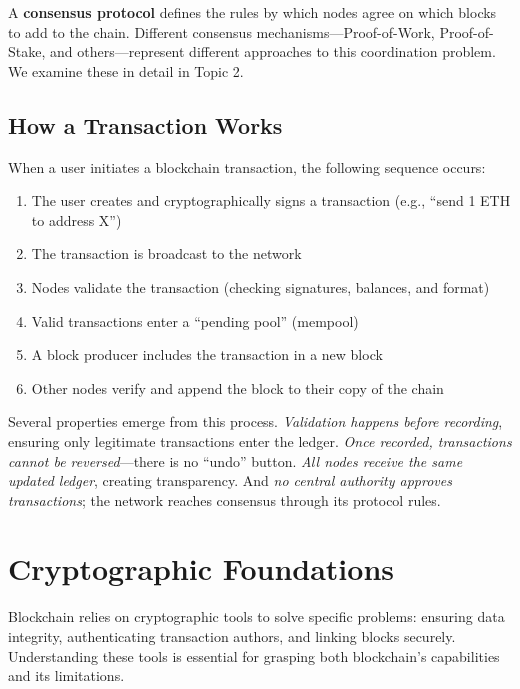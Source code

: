 \documentclass[11pt,a4paper]{article}
\newcommand{\keyword}[1]{\textbf{\textcolor{AccentOrange}{#1}}}
\begin{document}
A \keyword{consensus protocol} defines the rules by which nodes agree on which blocks to add to the chain. Different consensus mechanisms---Proof-of-Work, Proof-of-Stake, and others---represent different approaches to this coordination problem. We examine these in detail in Topic 2.

\subsection{How a Transaction Works}

When a user initiates a blockchain transaction, the following sequence occurs:

\begin{enumerate}
    \item The user creates and cryptographically signs a transaction (e.g., ``send 1 ETH to address X'')
    \item The transaction is broadcast to the network
    \item Nodes validate the transaction (checking signatures, balances, and format)
    \item Valid transactions enter a ``pending pool'' (mempool)
    \item A block producer includes the transaction in a new block
    \item Other nodes verify and append the block to their copy of the chain
\end{enumerate}

Several properties emerge from this process. \textit{Validation happens before recording}, ensuring only legitimate transactions enter the ledger. \textit{Once recorded, transactions cannot be reversed}---there is no ``undo'' button. \textit{All nodes receive the same updated ledger}, creating transparency. And \textit{no central authority approves transactions}; the network reaches consensus through its protocol rules.

\section{Cryptographic Foundations}

Blockchain relies on cryptographic tools to solve specific problems: ensuring data integrity, authenticating transaction authors, and linking blocks securely. Understanding these tools is essential for grasping both blockchain's capabilities and its limitations.
\end{document}
